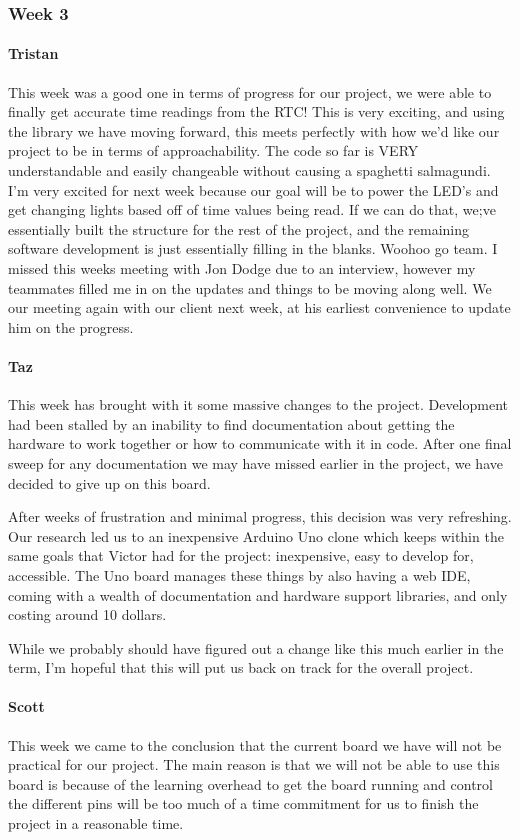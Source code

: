 \documentclass[onecolumn, draftclsnofoot,10pt, compsoc]{IEEEtran}
\begin{document}
\subsubsection{Week 3}
\paragraph{Tristan}
This week was a good one in terms of progress for our project, we were able to finally get accurate time readings from the RTC! This is very exciting, and using the library we have moving forward, this meets perfectly with how we'd like our project to be in terms of approachability. The code so far is VERY understandable and easily changeable without causing a spaghetti salmagundi. I'm very excited for next week because our goal will be to power the LED's and get changing lights based off of time values being read. If we can do that, we;ve essentially built the structure for the rest of the project, and the remaining software development is just essentially filling in the blanks. Woohoo go team. I missed this weeks meeting with Jon Dodge due to an interview, however my teammates filled me in on the updates and things to be moving along well. We our meeting again with our client next week, at his earliest convenience to update him on the progress.
\paragraph{Taz}
This week has brought with it some massive changes to the project. Development had been stalled by an inability to find documentation about getting the hardware to work together or how to communicate with it in code. After one final sweep for any documentation we may have missed earlier in the project, we have decided to give up on this board.

After weeks of frustration and minimal progress, this decision was very refreshing. Our research led us to an inexpensive Arduino Uno clone which keeps within the same goals that Victor had for the project: inexpensive, easy to develop for, accessible. The Uno board manages these things by also having a web IDE, coming with a wealth of documentation and hardware support libraries, and only costing around 10 dollars.

While we probably should have figured out a change like this much earlier in the term, I'm hopeful that this will put us back on track for the overall project.
\paragraph{Scott}
This week we came to the conclusion that the current board we have will not be practical for our project. The main reason is that we will not be able to use this board is because of the learning overhead to get the board running and control the different pins will be too much of a time commitment for us to finish the project in a reasonable time.
\end{document}
